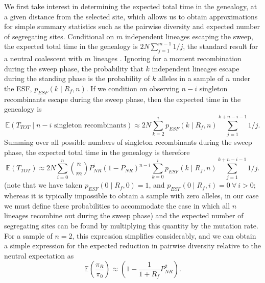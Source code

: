 \documentclass[a4paper,10pt]{article}
\begin{document}
We first take interest in determining the expected total time in the genealogy, at a given distance from the selected site, which allows us to obtain approximations for simple summary statistics such as the pairwise diversity and expected number of segregating sites. Conditional on $m$ independent lineages escaping the sweep, the expected total time in the genealogy is $2N \sum_{j=1}^{m-1} 1/j$, the standard result for a neutral coalescent with $m$ lineages \citep{Watterson:1975ur}. Ignoring for a moment recombination during the sweep phase, the probability that $k$ independent lineages escape during the standing phase is the probability of $k$ alleles in a sample of $n$ under the ESF, $p_{ESF}(k\mid R_f,n)$. If we condition on observing $n-i$ singleton recombinants escape during the sweep phase, then the expected time in the genealogy is
\begin{equation}
	\mathbb{E}(T_{TOT} \mid n-i \textrm{ singleton recombinants})  \approx 2N \sum_{k=2}^i p_{ESF}(k\mid R_f,n)   \sum_{j=1}^{k+n-i-1} 1/j.
\end{equation}
Summing over all possible numbers of singleton recombinants during the sweep phase, the expected total time in the genealogy is therefore
\begin{equation}
	\mathbb{E}(T_{TOT})  \approx 2N \sum_{i=0}^{n} {n \choose m} P_{NR}^{i} (1-P_{NR})^{n-i} \sum_{k=0}^i p_{ESF}(k\mid R_f,n)   \sum_{j=1}^{k+n-i-1} 1/j.
\end{equation}
(note that we have taken $p_{ESF}\left(0 \mid R_f,0\right)=1$, and $p_{ESF}\left(0 \mid R_f,i\right)=0\ \forall\ i > 0$; whereas it is typically impossible to obtain a sample with zero alleles, in our case we must define these probabilities to accommodate the case in which all $n$ lineages recombine out during the sweep phase)
and the expected number of segregating sites can be found by multiplying this quantity by the mutation rate. For a sample of $n = 2$, this expression simplifies considerably, and we can obtain a simple expression for the expected reduction in pairwise diversity relative to the neutral expectation as
\begin{equation}
	\mathbb{E}\left(\frac{\pi_R}{\pi_0}\right) \approx \left(1-\frac{1}{1 + R_f} P_{NR}^2  \right).
\end{equation}
\end{document}
